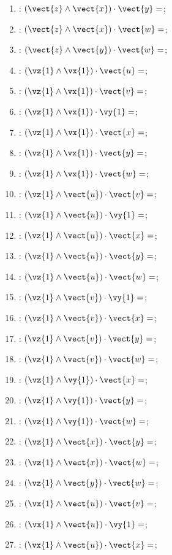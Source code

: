 \begin{multicols}{2}
\begin{enumerate}
\item : $\left(\vect{z}\wedge\vect{x}\right)\cdot\vect{y} =$;
\item : $\left(\vect{z}\wedge\vect{x}\right)\cdot\vect{w} =$;
\item : $\left(\vect{z}\wedge\vect{y}\right)\cdot\vect{w} =$;
\item : $\left(\vz{1}\wedge\vx{1}\right)\cdot\vect{u} =$;
\item : $\left(\vz{1}\wedge\vx{1}\right)\cdot\vect{v} =$;
\item : $\left(\vz{1}\wedge\vx{1}\right)\cdot\vy{1} =$;
\item : $\left(\vz{1}\wedge\vx{1}\right)\cdot\vect{x} =$;
\item : $\left(\vz{1}\wedge\vx{1}\right)\cdot\vect{y} =$;
\item : $\left(\vz{1}\wedge\vx{1}\right)\cdot\vect{w} =$;
\item : $\left(\vz{1}\wedge\vect{u}\right)\cdot\vect{v} =$;
\item : $\left(\vz{1}\wedge\vect{u}\right)\cdot\vy{1} =$;
\item : $\left(\vz{1}\wedge\vect{u}\right)\cdot\vect{x} =$;
\item : $\left(\vz{1}\wedge\vect{u}\right)\cdot\vect{y} =$;
\item : $\left(\vz{1}\wedge\vect{u}\right)\cdot\vect{w} =$;
\item : $\left(\vz{1}\wedge\vect{v}\right)\cdot\vy{1} =$;
\item : $\left(\vz{1}\wedge\vect{v}\right)\cdot\vect{x} =$;
\item : $\left(\vz{1}\wedge\vect{v}\right)\cdot\vect{y} =$;
\item : $\left(\vz{1}\wedge\vect{v}\right)\cdot\vect{w} =$;
\item : $\left(\vz{1}\wedge\vy{1}\right)\cdot\vect{x} =$;
\item : $\left(\vz{1}\wedge\vy{1}\right)\cdot\vect{y} =$;
\item : $\left(\vz{1}\wedge\vy{1}\right)\cdot\vect{w} =$;
\item : $\left(\vz{1}\wedge\vect{x}\right)\cdot\vect{y} =$;
\item : $\left(\vz{1}\wedge\vect{x}\right)\cdot\vect{w} =$;
\item : $\left(\vz{1}\wedge\vect{y}\right)\cdot\vect{w} =$;
\item : $\left(\vx{1}\wedge\vect{u}\right)\cdot\vect{v} =$;
\item : $\left(\vx{1}\wedge\vect{u}\right)\cdot\vy{1} =$;
\item : $\left(\vx{1}\wedge\vect{u}\right)\cdot\vect{x} =$;

\end{enumerate}
\end{multicols}
